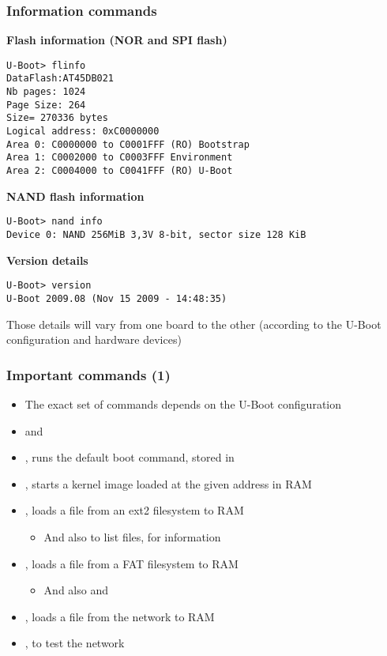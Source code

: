 \begin{frame}[fragile]
  \frametitle{Information commands}
\scriptsize
  {\bf Flash information (NOR and SPI flash)}
\begin{verbatim}
U-Boot> flinfo
DataFlash:AT45DB021
Nb pages: 1024
Page Size: 264
Size= 270336 bytes
Logical address: 0xC0000000
Area 0: C0000000 to C0001FFF (RO) Bootstrap
Area 1: C0002000 to C0003FFF Environment
Area 2: C0004000 to C0041FFF (RO) U-Boot
\end{verbatim}
  {\bf NAND flash information}
\begin{verbatim}
U-Boot> nand info
Device 0: NAND 256MiB 3,3V 8-bit, sector size 128 KiB
\end{verbatim}
  {\bf Version details}
\begin{verbatim}
U-Boot> version
U-Boot 2009.08 (Nov 15 2009 - 14:48:35)
\end{verbatim}
\normalsize
Those details will vary from one board to the other (according to the
U-Boot configuration and hardware devices)
\end{frame}

\begin{frame}
  \frametitle{Important commands (1)}
  \begin{itemize}
  \item The exact set of commands depends on the U-Boot configuration
  \item {} and 
  \item {}, runs the default boot command, stored in
  \item {} , starts a kernel image loaded at the
    given address in RAM
  \item {}, loads a file from an ext2 filesystem to RAM
    \begin{itemize}
    \item And also  to list files,  for
      information
    \end{itemize}
  \item {}, loads a file from a FAT filesystem to RAM
    \begin{itemize}
    \item And also  and 
    \end{itemize}
  \item {}, loads a file from the network to RAM
  \item {}, to test the network
  \end{itemize}
\end{frame}

